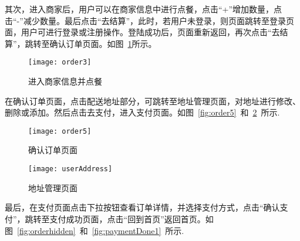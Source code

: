 其次，进入商家后，用户可以在商家信息中进行点餐，点击“+”增加数量，点击“-”减少数量。最后点击“去结算”，此时，若用户未登录，则页面跳转至登录页面，用户可进行登录或注册操作。登陆成功后，页面重新返回，再次点击“去结算”，跳转至确认订单页面。如图~\ref{fig:order3}所示。
\begin{figure}[htbp]
    \centering
    \texttt{[image: order3]}
    \caption{进入商家信息并点餐}\label{fig:order3}
\end{figure}

在确认订单页面，点击配送地址部分，可跳转至地址管理页面，对地址进行修改、删除或添加。然后点击去支付，进入支付页面。如图~\ref{fig:order5}~和~\ref{fig:userAddress}~所示.
\begin{figure}[htbp]
    \centering
    \begin{minipage}{0.4\textwidth}
        \centering
        \texttt{[image: order5]}
        \caption{确认订单页面}\label{fig:order5}
    \end{minipage}
    \begin{minipage}{0.4\textwidth}
        \centering
        \texttt{[image: userAddress]}
        \caption{地址管理页面}\label{fig:userAddress}
    \end{minipage}
    \vspace{\baselineskip}
\end{figure}

最后，在支付页面点击下拉按钮查看订单详情，并选择支付方式，点击“确认支付”，跳转至支付成功页面，点击“回到首页”返回首页。如图~\ref{fig:orderhidden}~和~\ref{fig:paymentDone1}~所示.


